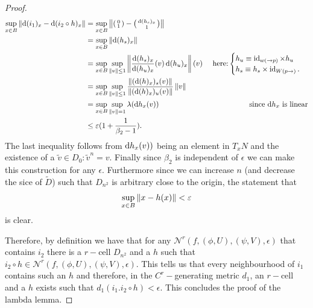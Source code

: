 \begin{proof}
	\begin{align*}
		\sup_{x\in B} \norm{ \diff( i_{1} )_x-\diff (i_2 \circ h )_x} &= \sup_{x\in B} \norm{ \begin{psmallmatrix}
				0 \\
				1
			\end{psmallmatrix}- \begin{psmallmatrix}
				\diff (h_s)_x \\
				1
		\end{psmallmatrix} } \\
		&=\sup _{x\in B} \norm{\diff (h_s)_x } &\\
		&= \sup_{x \in B} \sup_{\norm{v}\leq 1} \norm{\frac{\diff(h_s)_x}{\diff(h_u)_x}(v) \diff(h_u)_x}(v) & \text{ here:} \begin{cases} h_u \equiv  \id_{w(\to p)} \times h_u \\
			h_s \equiv h_s \times \id_{W(p \to)}.
		\end{cases} \\
		&=\sup_{x \in B} \sup_{\norm{v}\leq 1} \frac{\norm{(\diff(h)_x)_s(v)}}{\norm{(\diff(h)_x)_u(v)}}\norm{v}\\
		&= \sup_{x \in B} \sup_{\norm{v} = 1} \lambda(\diff h_x(v)) & \text{since $\diff h_x$ is linear} \\
		& \leq \epsilon(1+\frac{1}{\beta_2-1}).
	\end{align*} The last inequality follows from $\mathop{}\!\mathrm{d} h_x(v))$ being an element in $T_xN$ and the existence of a $\tilde{v} \in D_0:\tilde{v}^n=v$. Finally since $\beta_2$ is independent of $\epsilon$ we can make this construction for any $\epsilon$.
	Furthermore since we can increase $n$ (and decrease the sice of $\tilde{D}$) such that $D_{n^2}$ is arbitrary close to the origin, the statement that 
	\begin{equation*}
		\sup_{x\in B}\left\lVert x-h(x)\right\rVert<\varepsilon 
	\end{equation*} is clear.
	
	
	Therefore, by definition we have that for any $\mathcal{N}^r(f,(\phi,U),(\psi,V),\epsilon)$ that contains $i_2$ there is a $r-$cell $D_{n^2}$ and a $h$ such that $i_2 \circ h \in \mathcal{N}^r(f,(\phi,U),(\psi,V),\epsilon)$. This tells us that every neighbourhood of $i_1$ contains such an $h$ and therefore, in the $C^r-$generating metric $d_1$, an $r-$cell and a $h$ exists such that $d_1(i_1.i_2\circ h)<\epsilon.$ This concludes the proof of the lambda lemma.  	
	

\end{proof}
